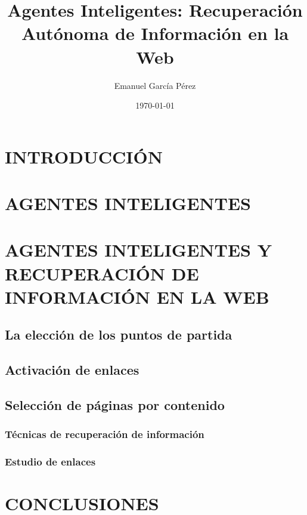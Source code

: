 \documentclass{beamer}
\title{\textbf{Agentes Inteligentes: Recuperaci\'on Aut\'onoma de Informaci\'on en la Web}}
\author{Emanuel Garc\'ia P\'erez}
\date{\today}
\begin{document}
\frame[allowframebreaks]{\titlepage}
\section[Contenidos]{}
\frame{
\transdissolve[duration=0.2]
\tableofcontents
} 



\section{INTRODUCCI\'ON}
\frame{
\transdissolve[duration=0.2]
\frametitle{}
}



\section{AGENTES INTELIGENTES}
\frame{
\transdissolve[duration=0.2]
\frametitle{}
}



\section{AGENTES INTELIGENTES Y RECUPERACI\'ON DE INFORMACI\'ON EN LA WEB}
\frame{
\transdissolve[duration=0.2]
\frametitle{}
}


\subsection{La elecci\'on de los puntos de partida}
\frame{
\transdissolve[duration=0.2]
\frametitle{}
}


\subsection{Activaci\'on de enlaces}
\frame{
\transdissolve[duration=0.2]
\frametitle{}
}


\subsection{Selecci\'on de p\'aginas por contenido}
\frame{
\transdissolve[duration=0.2]
\frametitle{}
}

\subsubsection{T\'ecnicas de recuperaci\'on de informaci\'on}
\frame{
\transdissolve[duration=0.2]
\frametitle{}
}

\subsubsection{Estudio de enlaces}
\frame{
\transdissolve[duration=0.2]
\frametitle{}
}



\section{CONCLUSIONES}
\frame{
\transdissolve[duration=0.2]
\frametitle{}
}
\end{document}
